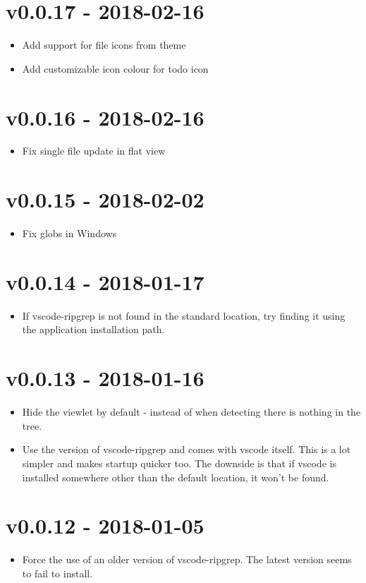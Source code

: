 \chapter{v0.0.17 - 2018-02-16}
\begin{itemize}
\item{Add support for file icons from theme}
\item{Add customizable icon colour for todo icon}
\end{itemize}

\chapter{v0.0.16 - 2018-02-16}
\begin{itemize}
\item{Fix single file update in flat view}
\end{itemize}

\chapter{v0.0.15 - 2018-02-02}
\begin{itemize}
\item{Fix globs in Windows}
\end{itemize}

\chapter{v0.0.14 - 2018-01-17}
\begin{itemize}
\item{If vscode-ripgrep is not found in the standard location, try finding it using the application installation path.}
\end{itemize}

\chapter{v0.0.13 - 2018-01-16}
\begin{itemize}
\item{Hide the viewlet by default - instead of when detecting there is nothing in the tree.}
\item{Use the version of vscode-ripgrep and comes with vscode itself. This is a lot simpler and makes startup quicker too. The downside is that if vscode is installed somewhere other than the default location, it won't be found.}
\end{itemize}

\chapter{v0.0.12 - 2018-01-05}
\begin{itemize}
\item{Force the use of an older version of vscode-ripgrep. The latest version seems to fail to install.}
\end{itemize}


